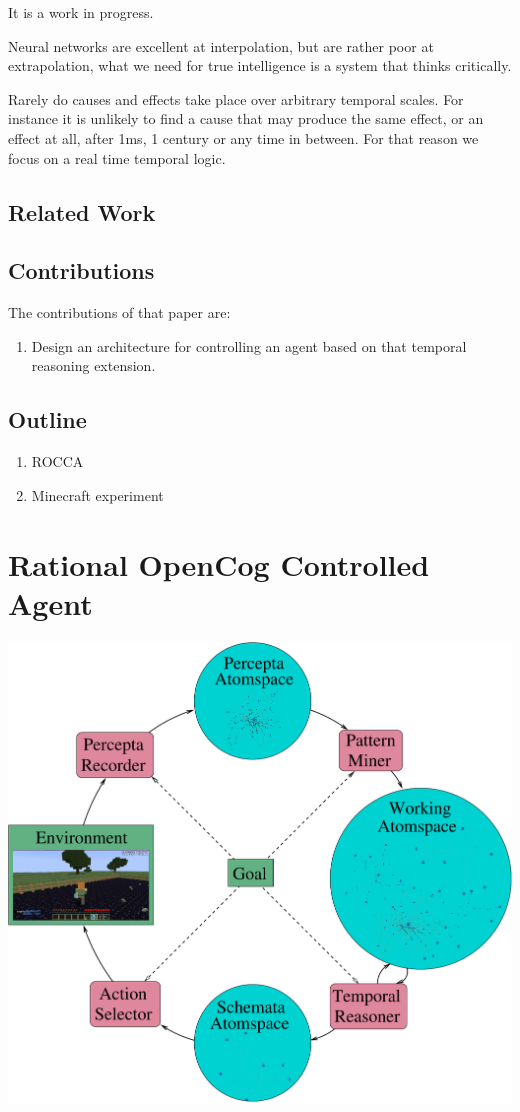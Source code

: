 \documentclass[runningheads]{llncs}
\begin{document}
It is a work in progress.

Neural networks are excellent at interpolation, but are rather poor at
extrapolation, what we need for true intelligence is a system that
thinks critically.

Rarely do causes and effects take place over arbitrary temporal
scales.  For instance it is unlikely to find a cause that may produce
the same effect, or an effect at all, after 1ms, 1 century or any time
in between.  For that reason we focus on a real time temporal logic.

\subsection{Related Work}

\subsection{Contributions}

The contributions of that paper are:
\begin{enumerate}
\item Design an architecture for controlling an agent based on that
  temporal reasoning extension.
\end{enumerate}

\subsection{Outline}

\begin{enumerate}
\item ROCCA
\item Minecraft experiment
\end{enumerate}

\section{Rational OpenCog Controlled Agent}

\includegraphics[width=1\textwidth]{pictures/rocca-chart-v0.7.pdf}
\end{document}
